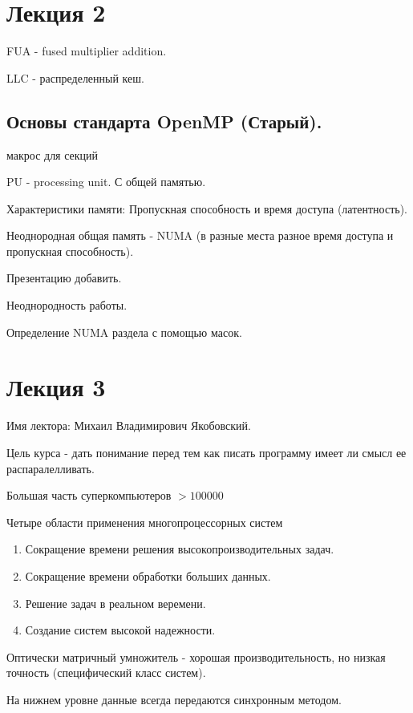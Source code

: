 \documentclass[14pt]{extarticle}
\begin{document}
\section{Лекция 2}

FUA - fused multiplier addition.

LLC - распределенный кеш. 

\subsection{ Основы стандарта OpenMP (Старый). }

макрос для секций

PU - processing unit. С общей памятью.

Характеристики памяти: Пропускная способность и время доступа (латентность).

Неоднородная общая память - NUMA (в разные места разное время доступа и пропускная способность).

Презентацию добавить.

Неоднородность работы.

Определение NUMA раздела с помощью масок.

\section{Лекция 3}

Имя лектора: Михаил Владимирович Якобовский.

Цель курса - дать понимание перед тем как писать программу имеет ли смысл ее распаралелливать.

Большая часть суперкомпьютеров $ >100 000 $

Четыре области применения многопроцессорных систем

\begin{enumerate}
	\item Сокращение времени решения высокопроизводительных задач.
	\item Сокращение времени обработки больших данных.
	\item Решение задач в реальном веремени.
	\item Создание систем высокой надежности.
\end{enumerate}

Оптически матричный умножитель - хорошая производительность, но низкая точность (специфический класс систем).

На нижнем уровне данные всегда передаются синхронным методом.
\end{document}
